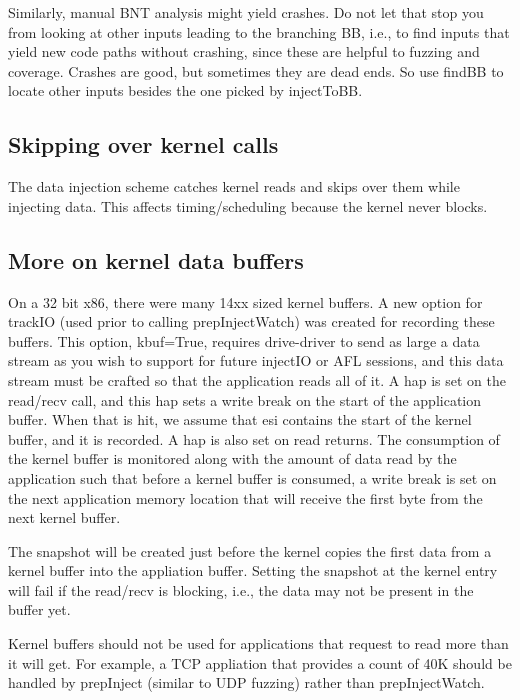 \documentclass[titlepage]{article}
\begin{document}
\begin{appendices}
Similarly, manual BNT analysis might yield crashes.  Do not let that stop you from looking at other inputs leading to the branching BB, i.e., to find inputs that
yield new code paths without crashing, since these are helpful to fuzzing and coverage.  Crashes are good, but sometimes they are dead ends.  So use findBB to locate other
inputs besides the one picked by injectToBB.


\subsection{Skipping over kernel calls}
The data injection scheme catches kernel reads and skips over them while injecting data.  This affects timing/scheduling because the kernel never
blocks.

\subsection{More on kernel data buffers}
On a 32 bit x86, there were many 14xx sized kernel buffers.  A new option for trackIO (used prior to calling prepInjectWatch) was created for recording these buffers.
This option, kbuf=True, requires drive-driver to send as large a data stream as you wish to support for future injectIO or AFL sessions, and this data stream
must be crafted so that the application reads all of it.  A hap is set on the read/recv call, and this hap sets a write break on the start of the application buffer.  When that is hit, we assume that esi contains the start of the kernel buffer, and it is recorded.  A hap is also set on read returns.  The consumption of the
kernel buffer is monitored along with the amount of data read by the application such that before a kernel buffer is consumed, a write break is set on the next 
application memory location that will receive the first byte from the next kernel buffer.

The snapshot will be created just before the kernel copies the first data from a kernel buffer into the appliation buffer.  Setting the snapshot at the kernel entry will fail if the read/recv
is blocking, i.e., the data may not be present in the buffer yet.

Kernel buffers should not be used for applications that request to read more than it will get.  For example, a TCP appliation that provides a count of 40K should be handled by
prepInject (similar to UDP fuzzing) rather than prepInjectWatch.


\end{appendices}
\end{document}
